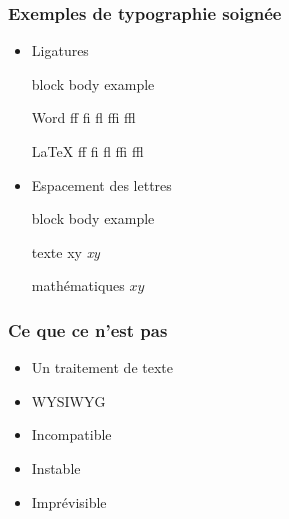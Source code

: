 \documentclass[aspectratio=54,10pt,xcolor=x11names]{beamer}
\renewenvironment{quote}{%
    \begin{beamercolorbox}[wd=\linewidth,sep=6pt]{block body example}}
    {\end{beamercolorbox}}
\theoremstyle{definition}
\begin{document}
\begin{frame}
  \frametitle{Exemples de typographie soignée}
  \begin{itemize}
  \item Ligatures
    \begin{quote}
      \begin{minipage}{0.45\linewidth}
        \vspace{-12pt}
        \begin{block}{\small Word}
          \rmfamily f\/f \quad f\/i \quad f\/l \quad f\/f\/i \quad
          f\/f\/l
        \end{block}
      \end{minipage}
      \hfill
      \begin{minipage}{0.4\linewidth}
        \vspace{-12pt}
        \begin{block}{\small \LaTeX}
          \rmfamily ff \quad fi \quad fl \quad ffi \quad ffl
        \end{block}
      \end{minipage}
    \end{quote}
  \item Espacement des lettres
    \begin{quote}
      \begin{minipage}{0.45\linewidth}
        \vspace{-12pt}
        \begin{block}{\small texte}
          \rmfamily xy \quad \emph{xy}
        \end{block}
      \end{minipage}
      \hfill
      \begin{minipage}{0.4\linewidth}
        \vspace{-12pt}
        \begin{block}{\small mathématiques}
          $xy$
        \end{block}
      \end{minipage}
    \end{quote}
  \end{itemize}
\end{frame}

\begin{frame}
  \frametitle{Ce que ce n'est pas}
  \begin{itemize}
  \item Un traitement de texte
  \item WYSIWYG
  \item Incompatible
  \item Instable
  \item Imprévisible
  \end{itemize}
\end{frame}
\end{document}
